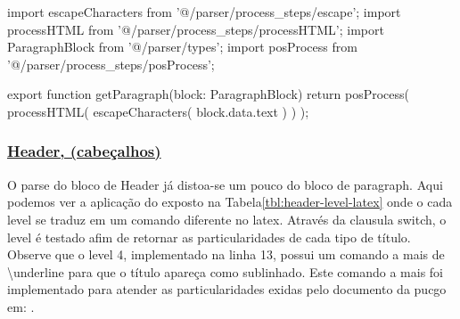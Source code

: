 \begin{getParagraphCode}
import { escapeCharacters } from '@/parser/process_steps/escape';
import { processHTML } from '@/parser/process_steps/processHTML';
import { ParagraphBlock } from '@/parser/types';
import { posProcess } from '@/parser/process_steps/posProcess';


export function getParagraph(block: ParagraphBlock){
    return posProcess(
        processHTML(
            escapeCharacters(
                block.data.text
            )
        )
    );
}
\end{getParagraphCode}

\subsubsection{\underline{Header, (cabeçalhos)}}

O parse do bloco de Header já distoa-se um pouco do bloco de paragraph.
Aqui podemos ver a aplicação do exposto na
Tabela\ref{tbl:header-level-latex}
onde o cada level se traduz em um comando diferente no latex. Através da
clausula switch, o level é testado afim de retornar as particularidades
de cada tipo de título. Observe que o level 4, implementado na linha 13,
possui um comando a mais de \textbackslash underline para que o título
apareça como sublinhado. Este comando a mais foi implementado
para atender as particularidades exidas pelo documento da
\acrshort{pucgo}
em:
\cite{pucgo}.


